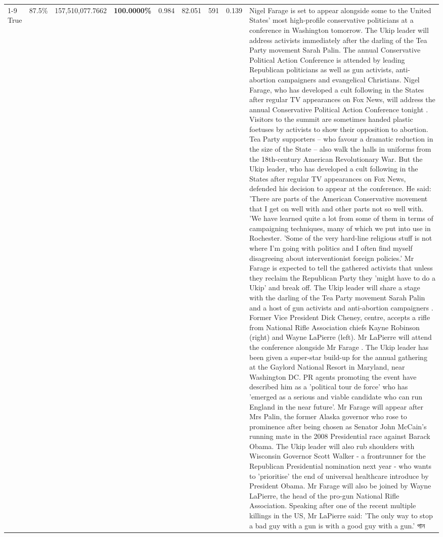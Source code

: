 \begin{table}[H]
\begin{tabular}{lllrlllll}
\cline{1-9} \cline{2-9}
True & 87.5\% & 157,510,077.7662 & \bfseries \color{red} 100.0000\% & 0.984 & 82.051 & 591 & 0.139 & Nigel Farage is set to appear alongside some to the United States' most high-profile conservative politicians at a conference in Washington tomorrow. The Ukip leader will address activists immediately after the darling of the Tea Party movement Sarah Palin. The annual Conservative Political Action Conference is attended by leading Republican politicians as well as gun activists, anti-abortion campaigners and evangelical Christians. Nigel Farage, who has developed a cult following in the States after regular TV appearances on Fox News, will address the annual Conservative Political Action Conference tonight . Visitors to the summit are sometimes handed plastic foetuses by activists to show their opposition to abortion. Tea Party supporters – who favour a dramatic reduction in the size of the State – also walk the halls in uniforms from the 18th-century American Revolutionary War. But the Ukip leader, who has developed a cult following in the States after regular TV appearances on Fox News, defended his decision to appear at the conference. He said: 'There are parts of the American Conservative movement that I get on well with and other parts not so well with. 'We have learned quite a lot from some of them in terms of campaigning techniques, many of which we put into use in Rochester. 'Some of the very hard-line religious stuff is not where I'm going with politics and I often find myself disagreeing about interventionist foreign policies.' Mr Farage is expected to tell the gathered activists that unless they reclaim the Republican Party they 'might have to do a Ukip' and break off. The Ukip leader will share a stage with the darling of the Tea Party movement Sarah Palin and a host of gun activists and anti-abortion campaigners . Former Vice President Dick Cheney, centre, accepts a rifle from National Rifle Association chiefs Kayne Robinson (right) and Wayne LaPierre (left). Mr LaPierre will attend the conference alongside Mr Farage . The Ukip leader has been given a super-star build-up for the annual gathering at the Gaylord National Resort in Maryland, near Washington DC. PR agents promoting the event have described him as a 'political tour de force' who has 'emerged as a serious and viable candidate who can run England in the near future'. Mr Farage will appear after Mrs Palin, the former Alaska governor who rose to prominence after being chosen as Senator John McCain's running mate in the 2008 Presidential race against Barack Obama. The Ukip leader will also rub shoulders with Wisconsin Governor Scott Walker - a frontrunner for the Republican Presidential nomination next year - who wants to 'prioritise' the end of universal healthcare introduce by President Obama. Mr Farage will also be joined by Wayne LaPierre, the head of the pro-gun National Rifle Association. Speaking after one of the recent multiple killings in the US, Mr LaPierre said: 'The only way to stop a bad guy with a gun is with a good guy with a gun.' গান \\

\end{tabular}
\end{table}
